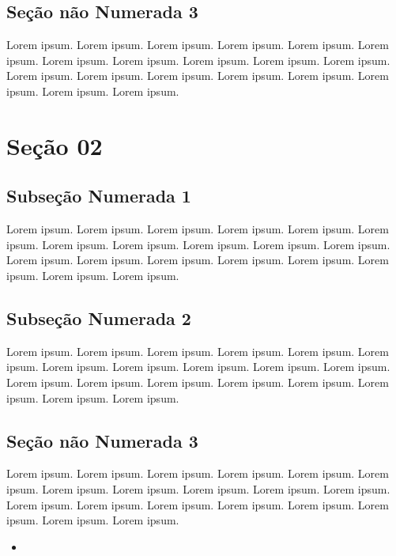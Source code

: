\documentclass[
]{book}
\providecommand{\tightlist}{%
  \setlength{\itemsep}{0pt}\setlength{\parskip}{0pt}}
\begin{document}
\hypertarget{seuxe7uxe3o-nuxe3o-numerada-3}{%
\subsection*{Seção não Numerada 3}\label{seuxe7uxe3o-nuxe3o-numerada-3}}

Lorem ipsum. Lorem ipsum. Lorem ipsum. Lorem ipsum. Lorem ipsum. Lorem ipsum. Lorem ipsum. Lorem ipsum. Lorem ipsum. Lorem ipsum. Lorem ipsum. Lorem ipsum. Lorem ipsum. Lorem ipsum. Lorem ipsum. Lorem ipsum. Lorem ipsum. Lorem ipsum. Lorem ipsum.

\hypertarget{seuxe7uxe3o-02}{%
\section{Seção 02}\label{seuxe7uxe3o-02}}

\hypertarget{subseuxe7uxe3o-numerada-1-1}{%
\subsection{Subseção Numerada 1}\label{subseuxe7uxe3o-numerada-1-1}}

Lorem ipsum. Lorem ipsum. Lorem ipsum. Lorem ipsum. Lorem ipsum. Lorem ipsum. Lorem ipsum. Lorem ipsum. Lorem ipsum. Lorem ipsum. Lorem ipsum. Lorem ipsum. Lorem ipsum. Lorem ipsum. Lorem ipsum. Lorem ipsum. Lorem ipsum. Lorem ipsum. Lorem ipsum.

\hypertarget{subseuxe7uxe3o-numerada-2-1}{%
\subsection{Subseção Numerada 2}\label{subseuxe7uxe3o-numerada-2-1}}

Lorem ipsum. Lorem ipsum. Lorem ipsum. Lorem ipsum. Lorem ipsum. Lorem ipsum. Lorem ipsum. Lorem ipsum. Lorem ipsum. Lorem ipsum. Lorem ipsum. Lorem ipsum. Lorem ipsum. Lorem ipsum. Lorem ipsum. Lorem ipsum. Lorem ipsum. Lorem ipsum. Lorem ipsum.

\hypertarget{seuxe7uxe3o-nuxe3o-numerada-3-1}{%
\subsection*{Seção não Numerada 3}\label{seuxe7uxe3o-nuxe3o-numerada-3-1}}

Lorem ipsum. Lorem ipsum. Lorem ipsum. Lorem ipsum. Lorem ipsum. Lorem ipsum. Lorem ipsum. Lorem ipsum. Lorem ipsum. Lorem ipsum. Lorem ipsum. Lorem ipsum. Lorem ipsum. Lorem ipsum. Lorem ipsum. Lorem ipsum. Lorem ipsum. Lorem ipsum. Lorem ipsum.

\begin{itemize}
\tightlist
\item
\end{itemize}

  
\end{document}
